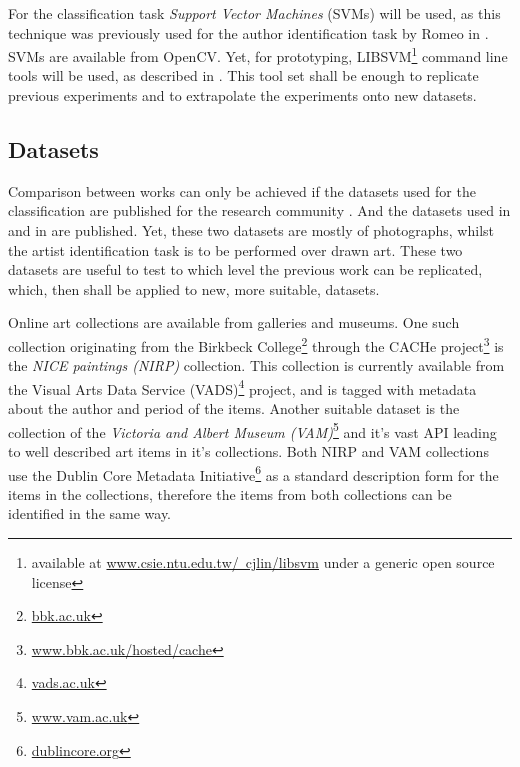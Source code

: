 \documentclass[a4paper]{article}
\begin{document}
For the classification task \emph{Support Vector Machines }(SVMs) will be used,
as this technique was previously used for the author identification task by
Romeo in \cite{rmc12ajs}.  SVMs are available from OpenCV.  Yet, for
prototyping, LIBSVM\footnote{available at
\href{http://www.csie.ntu.edu.tw/~cjlin/libsvm/}
{www.csie.ntu.edu.tw/~cjlin/libsvm} under a generic open source license}
command line tools will be used, as described in \cite{hcl03svm}.  This tool
set shall be enough to replicate previous experiments and to extrapolate the
experiments onto new datasets.

\subsection{Datasets}

Comparison between works can only be achieved if the datasets used for the
classification are published for the research community \cite{mach10clas}.  And
the datasets used in \cite{mach10clas} and in \cite{jma12clas} are published.
Yet, these two datasets are mostly of photographs, whilst the artist
identification task is to be performed over drawn art.  These two datasets are
useful to test to which level the previous work can be replicated, which, then
shall be applied to new, more suitable, datasets.

Online art collections are available from galleries and museums.  One such
collection originating from the Birkbeck College\footnote{
\href{http://www.bbk.ac.uk}{bbk.ac.uk}} through the CACHe project\footnote{
\href{http://www.bbk.ac.uk/hosted/cache/}{www.bbk.ac.uk/hosted/cache}} is the
\emph{NICE paintings (NIRP)} collection.  This collection is currently
available from the Visual Arts Data Service (VADS)\footnote{
\href{http://vads.ac.uk/}{vads.ac.uk}} project, and is tagged with metadata
about the author and period of the items.  Another suitable dataset is the
collection of the \emph{Victoria and Albert Museum (VAM)}\footnote{
\href{http://www.vam.ac.uk/}{www.vam.ac.uk}} and it's vast API leading to well
described art items in it's collections.  Both NIRP and VAM collections use the
Dublin Core Metadata Initiative\footnote{
\href{http://dublincore.org/}{dublincore.org}} as a standard description form
for the items in the collections, therefore the items from both collections can
be identified in the same way.

\end{document}

